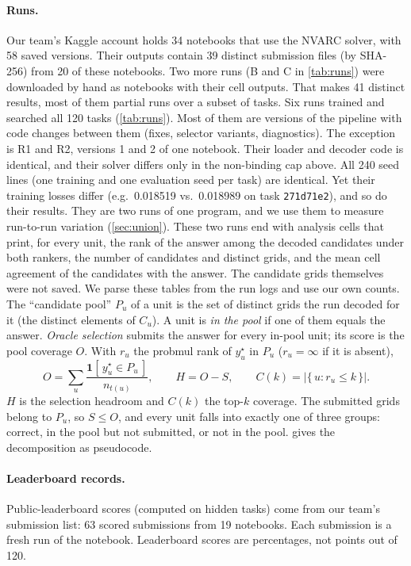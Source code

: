 \documentclass[11pt]{article}
\newcommand{\code}[1]{\texttt{#1}}
\newcommand{\R}[1]{R#1}
\begin{document}
\paragraph{Runs.}
Our team's Kaggle account holds 34 notebooks that use the NVARC solver, with 58 saved versions. Their outputs contain 39 distinct submission files (by SHA-256) from 20 of these notebooks. Two more runs (B and C in \cref{tab:runs}) were downloaded by hand as notebooks with their cell outputs. That makes 41 distinct results, most of them partial runs over a subset of tasks.
Six runs trained and searched all 120 tasks (\cref{tab:runs}). Most of them are versions of the pipeline with code changes between them (fixes, selector variants, diagnostics).
The exception is \R{1} and \R{2}, versions 1 and 2 of one notebook. Their loader and decoder code is identical, and their solver differs only in the non-binding cap above. All 240 seed lines (one training and one evaluation seed per task) are identical. Yet their training losses differ (e.g.\ 0.018519 vs.\ 0.018989 on task \code{271d71e2}), and so do their results. They are two runs of one program, and we use them to measure run-to-run variation (\cref{sec:union}).
These two runs end with analysis cells that print, for every unit, the rank of the answer among the decoded candidates under both rankers, the number of candidates and distinct grids, and the mean cell agreement of the candidates with the answer. The candidate grids themselves were not saved.
We parse these tables from the run logs and use our own counts. The ``candidate pool'' $P_u$ of a unit is the set of distinct grids the run decoded for it (the distinct elements of $C_u$). A unit is \emph{in the pool} if one of them equals the answer.
\emph{Oracle selection} submits the answer for every in-pool unit; its score is the pool coverage $O$. With $r_u$ the probmul rank of $y^\star_u$ in $P_u$ ($r_u=\infty$ if it is absent),
\begin{equation}
\label{eq:oracle}
O = \sum_{u} \frac{\mathbf{1}[\,y^\star_u \in P_u\,]}{n_{t(u)}}, \qquad
H = O - S, \qquad
C(k) = \big|\{\,u : r_u \le k\,\}\big| .
\end{equation}
$H$ is the selection headroom and $C(k)$ the top-$k$ coverage. The submitted grids belong to $P_u$, so $S \le O$, and every unit falls into exactly one of three groups: correct, in the pool but not submitted, or not in the pool.
 gives the decomposition as pseudocode.

\paragraph{Leaderboard records.}
Public-leaderboard scores (computed on hidden tasks) come from our team's submission list: 63 scored submissions from 19 notebooks. Each submission is a fresh run of the notebook. Leaderboard scores are percentages, not points out of 120.
\end{document}
